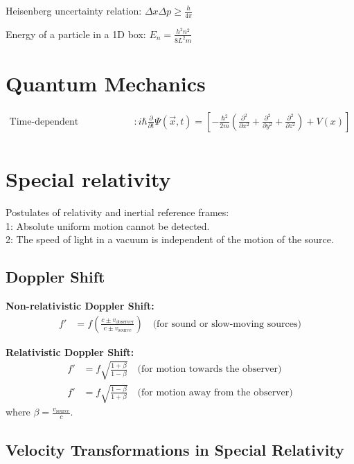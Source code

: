 \documentclass[12pt,a4paper]{article}
\begin{document}
	Heisenberg uncertainty relation: \( \Delta x \Delta p \geq \frac{h}{4\pi} \)
	
	Energy of a particle in a 1D box: \( E_n = \frac{h^2 n^2}{8L^2m} \)

	
	\section*{Quantum Mechanics}
	\begin{align*}
		\text{Time-dependent Schrodinger's Equation} & : i\hbar \frac{\partial}{\partial t} \Psi (\vec{x}, t) = [-\frac{\hbar^2}{2m}(\frac{\partial ^2}{\partial x^2} + \frac{\partial ^2}{\partial y ^2} + \frac{\partial^2}{\partial z^2}) + V(x)] \\
	\end{align*}
	
	\section*{Special relativity}
	Postulates of relativity and inertial reference frames:\\
	1: Absolute uniform motion cannot be detected.\\
	2: The speed of light in a vacuum is independent of the motion of the source.\\
	
	\subsection*{Doppler Shift}
	
	\textbf{Non-relativistic Doppler Shift:}
	\begin{align}
		f' &= f \left( \frac{c \pm v_{\text{observer}}}{c \pm v_{\text{source}}} \right) \quad \text{(for sound or slow-moving sources)}
	\end{align}
	
	\textbf{Relativistic Doppler Shift:}
	\begin{align}
		f' &= f \sqrt{\frac{1 + \beta}{1 - \beta}} \quad \text{(for motion towards the observer)} \\
		f' &= f \sqrt{\frac{1 - \beta}{1 + \beta}} \quad \text{(for motion away from the observer)}
	\end{align}
	where \( \beta = \frac{v_{\text{source}}}{c} \).
	
	\subsection*{Velocity Transformations in Special Relativity}
	
\end{document}
